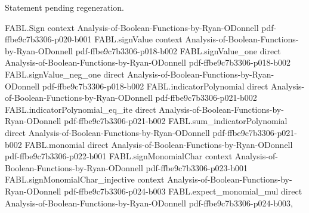 \begin{theorem}
\label{FABL.two_mul_variance_rademacherNorm_le_secondMoment}
\leanok
{}
Statement pending regeneration.
\end{theorem}

\begin{theorem}
\label{FABL.khintchineKahane}
\leanok
{}
\proofstep
  {FABL.Sign}
  {context}
  {Analysis-of-Boolean-Functions-by-Ryan-ODonnell}
  {pdf-ffbe9c7b3306-p020-b001}
\proofstep
  {FABL.signValue}
  {context}
  {Analysis-of-Boolean-Functions-by-Ryan-ODonnell}
  {pdf-ffbe9c7b3306-p018-b002}
\proofstep
  {FABL.signValue_one}
  {direct}
  {Analysis-of-Boolean-Functions-by-Ryan-ODonnell}
  {pdf-ffbe9c7b3306-p018-b002}
\proofstep
  {FABL.signValue_neg_one}
  {direct}
  {Analysis-of-Boolean-Functions-by-Ryan-ODonnell}
  {pdf-ffbe9c7b3306-p018-b002}
\proofstep
  {FABL.indicatorPolynomial}
  {direct}
  {Analysis-of-Boolean-Functions-by-Ryan-ODonnell}
  {pdf-ffbe9c7b3306-p021-b002}
\proofstep
  {FABL.indicatorPolynomial_eq_ite}
  {direct}
  {Analysis-of-Boolean-Functions-by-Ryan-ODonnell}
  {pdf-ffbe9c7b3306-p021-b002}
\proofstep
  {FABL.sum_indicatorPolynomial}
  {direct}
  {Analysis-of-Boolean-Functions-by-Ryan-ODonnell}
  {pdf-ffbe9c7b3306-p021-b002}
\proofstep
  {FABL.monomial}
  {direct}
  {Analysis-of-Boolean-Functions-by-Ryan-ODonnell}
  {pdf-ffbe9c7b3306-p022-b001}
\proofstep
  {FABL.signMonomialChar}
  {context}
  {Analysis-of-Boolean-Functions-by-Ryan-ODonnell}
  {pdf-ffbe9c7b3306-p023-b001}
\proofstep
  {FABL.signMonomialChar_injective}
  {context}
  {Analysis-of-Boolean-Functions-by-Ryan-ODonnell}
  {pdf-ffbe9c7b3306-p024-b003}
\proofstep
  {FABL.expect_monomial_mul}
  {direct}
  {Analysis-of-Boolean-Functions-by-Ryan-ODonnell}
  {pdf-ffbe9c7b3306-p024-b003,
}
\end{theorem}
